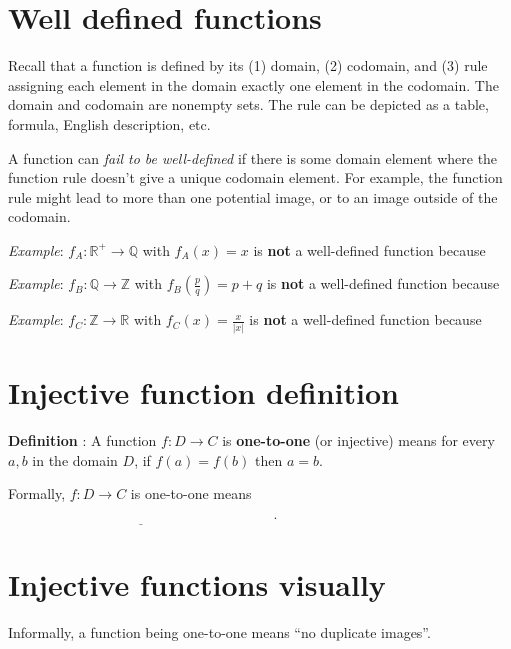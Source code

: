 \documentclass[12pt, oneside]{article}
\begin{document}
\vfill \vfill
\section*{Well defined functions}


Recall that a function is defined by its (1) domain, (2) codomain, and (3) rule assigning each 
element in the domain exactly one element in the codomain. 
The domain and codomain are nonempty sets.
The rule can be depicted as a table, formula, English description, etc.

A function can {\it fail to be well-defined} if there is some 
domain element where the function rule doesn't give a
unique codomain element. For example, the function rule might lead to 
more than one potential image, or to an image outside of the codomain.


{\it Example}: $f_A: \mathbb{R}^+ \to \mathbb{Q}$ with $f_A(x) = x$ is {\bf not} a well-defined function because

\vspace{100pt}


{\it Example}: $f_B: \mathbb{Q} \to \mathbb{Z}$ with $f_B\left(\frac{p}{q}\right) = p+q$ is {\bf not} a well-defined function because

\vspace{100pt}


{\it Example}: $f_C: \mathbb{Z} \to \mathbb{R}$ with $f_C(x) = \frac{x}{|x|}$ is {\bf not} a well-defined function because

\vspace{100pt}
 \vfill
\section*{Injective function definition}


{\bf Definition} : A function $f: D  \to C$ is {\bf one-to-one} (or  injective) 
means for every $a,b$ in the domain $D$, 
if $f(a) = f(b)$ then  $a=b$.

Formally, $f: D  \to  C$ is  one-to-one  means $\underline{\phantom{\forall a \in D \forall b \in D ~(f(a) = f(b) \to a = b)}}$.
 \vfill
\section*{Injective functions visually}


Informally, a function being one-to-one means ``no duplicate images''.

\phantom{Draw finite domain, finite codomain picture with duplicate image.}
\vspace{50pt} \vfill
\end{document}
